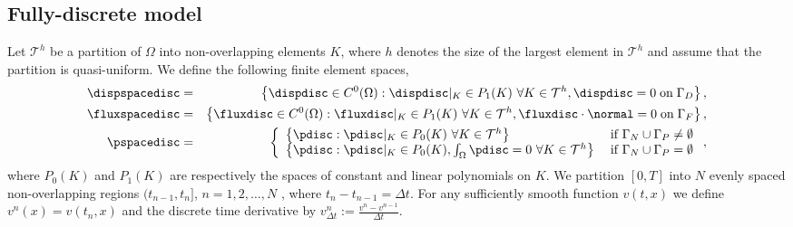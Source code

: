  


\subsection{Fully-discrete model}
\label{sec:fully_discrete}
Let $\mathcal{T}^{h}$ be a partition of $\Omega$ into non-overlapping elements $K$, where $h$ denotes the size of the largest element in $\mathcal{T}^{h}$ and assume that the partition is quasi-uniform. We define the following finite element spaces,
\begin{eqnarray*}
\dispspacedisc &=& \left\lbrace \dispdisc  \in C^{0}(\Omega): \dispdisc |_{K} \in P_{1}(K) \ \forall K \in \mathcal{T}^{h}, \dispdisc  = 0 \; \mbox{on} \;\Gamma_{D} \right\rbrace,  \\
\fluxspacedisc &=&\left\lbrace \fluxdisc  \in C^{0}(\Omega): \fluxdisc |_{K} \in P_{1}(K) \ \forall K \in \mathcal{T}^{h},  \fluxdisc \cdot \normal = 0 \; \mbox{on} \;\Gamma_{F} \right\rbrace, \\
\pspacedisc &=& \left\lbrace
  \begin{array}{l l}
    \left\lbrace \pdisc: \pdisc |_{K} \in P_{0}(K) \ \forall K \in \mathcal{T}^{h} \right\rbrace & \; \text{if $\Gamma_{N} \cup \Gamma_{P} \neq \emptyset$}\\
    \left\lbrace \pdisc: \pdisc |_{K} \in P_{0}(K), \int_{\Omega}  \pdisc =0 \ \forall K \in \mathcal{T}^{h}\right\rbrace & \; \text{if $\Gamma_{N} \cup \Gamma_{P}=\emptyset$}
  \end{array} \right. ,
\end{eqnarray*}
where $P_{0}(K)$ and $P_{1}(K)$ are respectively the spaces of constant and linear polynomials on $K$. We partition $[0,T]$ into $N$ evenly spaced non-overlapping regions $(t_{n-1}, t_n]$, $n=1,2,\dots, N$ , where $t_n-t_{n-1} = \Delta t$. For any sufficiently smooth function $v(t,x)$ we define $v^n(x) = v(t_n,x)$  and the discrete time derivative by $v_{\Delta t}^{n} := \frac{v^{n}-v^{n-1}}{\Delta t}$.

